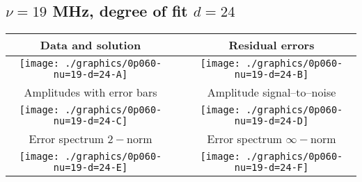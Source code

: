

% 

\clearpage{}
\break{}

\subsection{$\nu = 19$ MHz, degree of fit $d = 24$}

\begin{table}[h]
    \begin{center}
        \begin{tabular}{ccc}
            Data and solution & \quad & Residual errors \\\hline
            \texttt{[image: ./graphics/0p060-nu=19-d=24-A]} &&
            \texttt{[image: ./graphics/0p060-nu=19-d=24-B]} \\[15pt]
            Amplitudes with error bars && Amplitude signal--to--noise \\\hline
            \texttt{[image: ./graphics/0p060-nu=19-d=24-C]} &&
            \texttt{[image: ./graphics/0p060-nu=19-d=24-D]} \\[15pt]
            Error spectrum $2-$norm && Error spectrum $\infty-$norm \\\hline
            \texttt{[image: ./graphics/0p060-nu=19-d=24-E]} &&
            \texttt{[image: ./graphics/0p060-nu=19-d=24-F]} \\[15pt]
        \end{tabular}
    \end{center}
\label{fig:elev=60, nu=19}
\end{table}



\endinput
